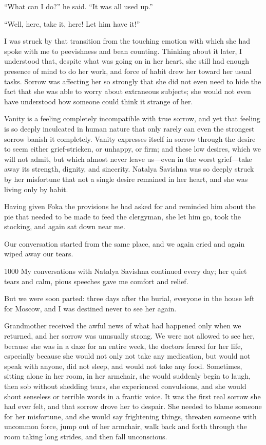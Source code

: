 ``What can I do?'' he said. ``It was all used up.'' %

``Well, here, take it, here! Let him have it!'' %

I was struck by that transition from the touching emotion with which she had spoke with me to peevishness and bean counting. Thinking about it later, I understood that, despite what was going on in her heart, she still had enough presence of mind to do her work, and force of habit drew her toward her usual tasks. Sorrow was affecting her so strongly that she did not even need to hide the fact that she was able to worry about extraneous subjects; she would not even have understood how someone could think it strange of her.

Vanity is a feeling completely incompatible with true sorrow, and yet that feeling is so deeply inculcated in human nature that only rarely can even the strongest sorrow banish it completely. Vanity expresses itself in sorrow through the desire to seem either grief-stricken, or unhappy, or firm; and these low desires, which we will not admit, but which almost never leave us---even in the worst grief---take away its strength, dignity, and sincerity. Natalya Savishna was so deeply struck by her misfortune that not a single desire remained in her heart, and she was living only by habit.

Having given Foka the provisions he had asked for and reminded him about the pie that needed to be made to feed the clergyman, she let him go, took the stocking, and again sat down near me.

Our conversation started from the same place, and we again cried and again wiped away our tears.

\begin{tolerant}{1000}
My conversations with Natalya Savishna continued every day; her quiet tears and calm, pious speeches gave me comfort and relief.
\end{tolerant}

But we were soon parted: three days after the burial, everyone in the house left for Moscow, and I was destined never to see her again.

Grandmother received the awful news of what had happened only when we returned, and her sorrow was unusually strong. We were not allowed to see her, because she was in a daze for an entire week, the doctors feared for her life, especially because she would not only not take any medication, but would not speak with anyone, did not sleep, and would not take any food. Sometimes, sitting alone in her room, in her armchair, she would suddenly begin to laugh, then sob without shedding tears, she experienced convulsions, and she would shout senseless or terrible words in a frantic voice. It was the first real sorrow she had ever felt, and that sorrow drove her to despair. She needed to blame someone for her misfortune, and she would say frightening things, threaten someone with uncommon force, jump out of her armchair, walk back and forth through the room taking long strides, and then fall unconscious.

